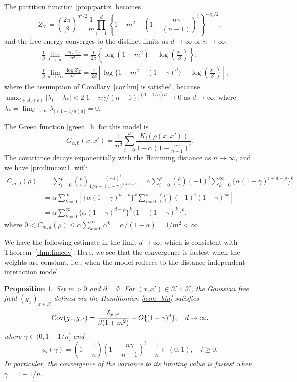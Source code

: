 \documentclass[a4paper,11pt]{article}
\theoremstyle{plain}
\newtheorem{proposition}[theorem]{Proposition}
\theoremstyle{definition}
\begin{document}
The partition function \eqref{prop:part:z} becomes
\[
  Z_\mathcal{X}
  =\left(\frac{2\pi}{\beta}\right)^{n^d/2}\frac{1}{m}
  \prod_{i=1}^d
  \left\{1+m^2-\left(1-\frac{n\gamma}{(n-1)}\right)^i\right\}^{-\kappa_i/2},
\]
and the free energy converges to the distinct limits
as $d\to\infty$ or $n\to\infty$:
\begin{align*}
  &-\frac{1}{\beta}\lim_{d\to\infty}\frac{\log Z_{\mathcal{X}}}{n^d}
  =\frac{1}{2\beta}\left\{
  \log(1+m^2)-\log\left(\frac{2\pi}{\beta}\right)\right\};\\
  &-\frac{1}{\beta}\lim_{n\to\infty}\frac{\log Z_{\mathcal{X}}}{n^d}
  = \frac{1}{2\beta}\left[
    \log\{1+m^2-(1-\gamma)^d\}-\log\left(\frac{2\pi}{\beta}\right)
    \right],
\end{align*}
where the assumption of Corollary~\ref{cor:lim} is satisfied,
because
$\max_{i\in A_d(\epsilon)}|\lambda_i-\lambda_*|<2|1-n\gamma/(n-1)|^{(1-1/n)d}\to 0$ as $d\to \infty$, where $\lambda_*=\lim_{d\to\infty}\lambda_{\lfloor(1-1/n)d\rfloor}=0$.

The Green function \eqref{green_h} for this model is
\begin{equation}\label{cov_bin}
  G_{\alpha,\emptyset}(x,x')=
  \frac{1}{n^d}\sum_{i=0}^d
  \frac{K_i(\rho(x,x'))}{1-\alpha\left(1-\frac{n\gamma}{n-1}\right)^i}.
\end{equation}
The covariance decays exponentially with the Hamming distance
as $n\to\infty$, and we have \eqref{pro:limcov:1} with 
\begin{align*}
  C_{m,d}(\rho)&=
  \sum_{i=0}^\rho\binom{\rho}{i}
  \frac{(-1)^i}{1/\alpha-(1-\gamma)^{i+d-\rho}}
  =\alpha\sum_{i=0}^\rho\binom{\rho}{i}(-1)^i
  \sum_{k=0}^\infty\{\alpha(1-\gamma)^{i+d-\rho}\}^k
  \\
  &=\alpha\sum_{k=0}^\infty
  \left[\{\alpha(1-\gamma)^{d-\rho}\}^k
  \sum_{i=0}^\rho
  \binom{\rho}{i}(-1)^i(1-\gamma)^{ik}\right]\\
  &=\alpha\sum_{k=0}^\infty
  \{\alpha(1-\gamma)^{d-\rho}\}^k
  \{1-(1-\gamma)^k\}^\rho,
\end{align*}
where
$0 < C_{m,d}(\rho)\le\alpha\sum_{k=0}^\infty\alpha^k=\alpha/(1-\alpha)=1/m^2<\infty$.

We have the following estimate in the limit $d\to\infty$,
which is consistent with Theorem~\ref{thm:limcov}.
Here, we see that the convergence is fastest when
the weights are constant, i.e., when the model reduces
to the distance-independent interaction model.

\begin{proposition}\label{prop:binom}
  Set $m>0$ and $\partial=\emptyset$. For
  $(x,x')\in\mathcal{X}\times\mathcal{X}$,
  the Gaussian free field $(g_x)_{x\in\mathcal{X}}$
  defined via the Hamiltonian \eqref{ham_bin} satisfies
  \[
    {\rm Cov}(g_x,g_{x'})=
    \frac{\delta_{x,x'}}{\beta(1+m^2)}+
    O\{(1-\gamma)^d\},
    \quad d\to\infty,
  \]
  where $\gamma\in(0,1-1/n]$ and
  \[
    a_i(\gamma)=\left(1-\frac{1}{n}\right)
    \left(1-\frac{n\gamma}{n-1}\right)^i+\frac{1}{n} \in(0,1),
    \quad i\ge 0.
  \]
  In particular, the convergence of the variance
  to its limiting value is fastest when $\gamma=1-1/n$.
\end{proposition}
\end{document}
